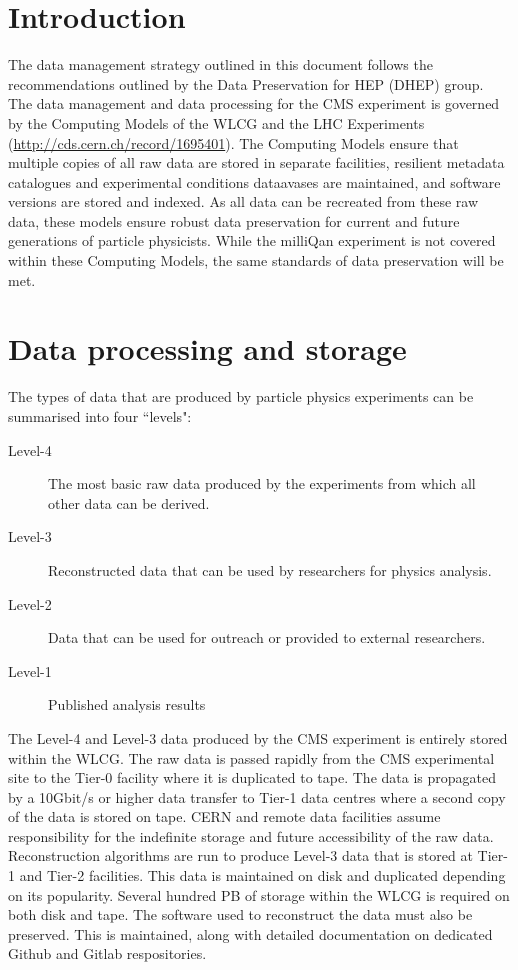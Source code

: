 \documentclass[11pt,a4paper]{article}
\theoremstyle{plain} \numberwithin{equation}{section}
\theoremstyle{definition}
\begin{document}
\section*{Introduction}

The data management strategy outlined in this document follows the recommendations
outlined by the Data Preservation for HEP (DHEP) group. The data management and 
data processing for the CMS experiment is governed by the Computing Models of the WLCG and 
the LHC Experiments (\href{http://cds.cern.ch/record/1695401}{http://cds.cern.ch/record/1695401}). 
The Computing Models ensure that multiple copies of all raw data 
are stored in separate facilities, resilient metadata catalogues and
experimental conditions dataavases are maintained, 
and software versions are stored and indexed. As all data can be recreated from 
these raw data, these models ensure robust data preservation for current and future
generations of particle physicists. While the milliQan
experiment is not covered within these Computing Models, the same standards of data preservation
will be met. 

\section*{Data processing and storage}

The types of data that are produced by particle physics experiments can
be summarised into four ``levels":

\begin{description}
    \item [Level-4] {The most basic raw data produced by the experiments from which all other data can be derived.}
    \item [Level-3] {Reconstructed data that can be used by researchers for physics analysis.}
    \item [Level-2] {Data that can be used for outreach or provided to external researchers.}
    \item [Level-1] {Published analysis results}
\end{description}

The Level-4 and Level-3 data produced by the CMS experiment is entirely stored within the WLCG. 
The raw data is passed rapidly from the CMS experimental site to
the Tier-0 facility where it is duplicated to tape. The data is propagated by a 10Gbit/s or higher data transfer 
to Tier-1 data centres where a second copy of the data is stored on tape. CERN and 
remote data facilities assume responsibility for the indefinite storage and future accessibility of the raw data.
Reconstruction algorithms are run to produce Level-3 data that is stored at Tier-1 and Tier-2 facilities. 
This data is maintained on disk and duplicated depending on its popularity. Several hundred PB of
storage within the WLCG is required on both disk and tape.
The software used to reconstruct the data must also be preserved. This is maintained, along with
detailed documentation on dedicated Github and Gitlab respositories.
\end{document}
